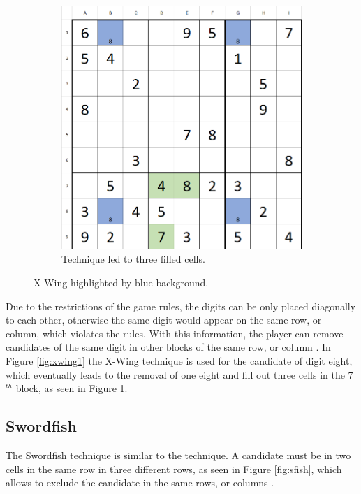 \documentclass[twoside]{ausarbeitung}
\begin{document}
\begin{figure}[H]
\begin{subfigure}[t]{.475\textwidth}
  \includegraphics[width=\linewidth]{images/x_wing2.png}
  \caption{Technique led to three filled cells.}
  \label{fig:xwing2}
\end{subfigure}
\caption[X-Wing]{X-Wing highlighted by blue background.}
\label{fig:xwing}
\end{figure}

Due to the restrictions of the game rules, the digits can be only placed diagonally to each other, otherwise the same digit would appear on the same row, or column, which violates the rules. With this information, the player can remove candidates of the same digit in other blocks of the same row, or column \cite{SudokuXW66:online}. In Figure \ref{fig:xwing1} the X-Wing technique is used for the candidate of digit eight, which eventually leads to the removal of one eight and fill out three cells in the 7$^{th}$ block, as seen in Figure \ref{fig:xwing2}.


\subsection{Swordfish}
The Swordfish technique is similar to the  technique. A candidate must be in two cells in the same row in three different rows, as seen in Figure \ref{fig:sfish}, which allows to exclude the candidate in the same rows, or columns \cite{SudokuTr32:online}.
\end{document}

